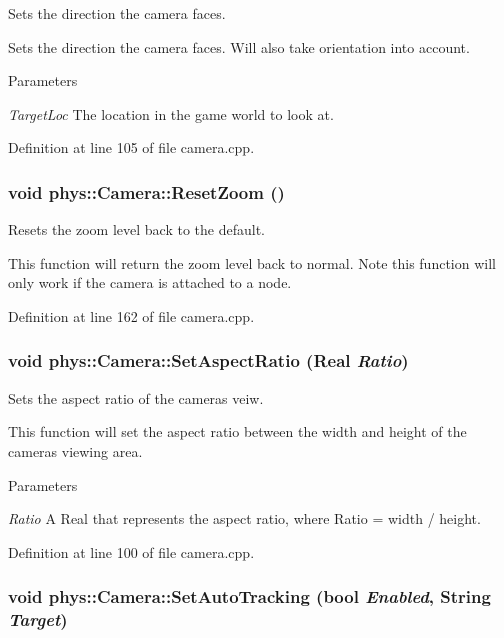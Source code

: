 Sets the direction the camera faces. 

Sets the direction the camera faces. Will also take orientation into account. 
\begin{DoxyParams}{Parameters}
\item[{\em TargetLoc}]The location in the game world to look at. \end{DoxyParams}


Definition at line 105 of file camera.cpp.

\hypertarget{classphys_1_1Camera_a181465e6add36c07a63fdd26aee7c69a}{
\subsubsection[{ResetZoom}]{\setlength{\rightskip}{0pt plus 5cm}void phys::Camera::ResetZoom ()}}
\label{d9/df8/classphys_1_1Camera_a181465e6add36c07a63fdd26aee7c69a}


Resets the zoom level back to the default. 

This function will return the zoom level back to normal. Note this function will only work if the camera is attached to a node. 

Definition at line 162 of file camera.cpp.

\hypertarget{classphys_1_1Camera_a6f895759e653eedb985217c621b265f6}{
\subsubsection[{SetAspectRatio}]{\setlength{\rightskip}{0pt plus 5cm}void phys::Camera::SetAspectRatio ({\bf Real} {\em Ratio})}}
\label{d9/df8/classphys_1_1Camera_a6f895759e653eedb985217c621b265f6}


Sets the aspect ratio of the cameras veiw. 

This function will set the aspect ratio between the width and height of the cameras viewing area. 
\begin{DoxyParams}{Parameters}
\item[{\em Ratio}]A Real that represents the aspect ratio, where Ratio = width / height. \end{DoxyParams}


Definition at line 100 of file camera.cpp.

\hypertarget{classphys_1_1Camera_a5f66e37056f03767b6048f8bd4465983}{
\subsubsection[{SetAutoTracking}]{\setlength{\rightskip}{0pt plus 5cm}void phys::Camera::SetAutoTracking (bool {\em Enabled}, \/  {\bf String} {\em Target})}}
\label{d9/df8/classphys_1_1Camera_a5f66e37056f03767b6048f8bd4465983}


